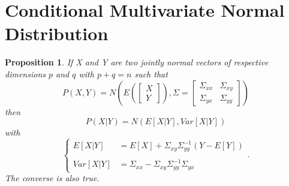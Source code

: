 \documentclass{article}
\newtheorem{prop}[thm]{Proposition}
\theoremstyle{definition}
\theoremstyle{remark}
\begin{document}
\section{Conditional Multivariate Normal Distribution}\label{app:MultiNormal}
\begin{prop}\label{prop:MultiNormal} %
If X and Y are two jointly normal vectors of respective dimensions $p$ and $q$ with $p+q=n$ such that
$$P(X,Y)=N\left(
E\left( \begin{bmatrix} X\\ Y \end{bmatrix} \right)
, \Sigma = \begin{bmatrix}
\Sigma_{xx} & \Sigma_{xy}\\ 
\Sigma_{yx} & \Sigma_{yy}
\end{bmatrix}\right)$$
then 
$$P(X|Y)=N\left( E[X|Y], Var[X|Y] \right)$$
with
\begin{equation*}
\left\{ 
\begin{array}{rl}
E[X|Y]&=E[X]+\Sigma_{xy}\Sigma_{yy}^{-1}(Y-E[Y])\\
\\
Var[X|Y]&=\Sigma_{xx}-\Sigma_{xy}\Sigma_{yy}^{-1}\Sigma_{yx}
\end{array} \right. .
\end{equation*}
The converse is also true.
\end{prop}
\end{document}
